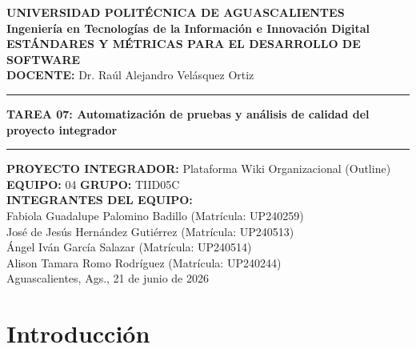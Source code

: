 \documentclass[12pt,oneside]{report}
\begin{document}
\begin{titlepage}
    \centering
    \textbf{UNIVERSIDAD POLITÉCNICA DE AGUASCALIENTES} \\[0.4cm]
    \textbf{Ingeniería en Tecnologías de la Información e Innovación Digital} \\[1.5cm]
    
    {\large \textbf{ESTÁNDARES Y MÉTRICAS PARA EL DESARROLLO DE SOFTWARE}} \\[0.5cm]
    {\large \textbf{DOCENTE:} Dr. Raúl Alejandro Velásquez Ortiz} \\[1.5cm]
    
    \hrule
    \vspace{0.4cm}
    {\Large \textbf{TAREA 07: Automatización de pruebas y análisis de calidad del proyecto integrador}} \\[0.4cm]
    \hrule
    \vspace{1.5cm}
    
    {\large \textbf{PROYECTO INTEGRADOR:} Plataforma Wiki Organizacional (Outline)} \\[0.5cm]
    {\large \textbf{EQUIPO:} 04 \quad \textbf{GRUPO:} TIID05C} \\[1cm]
    
    {\large \textbf{INTEGRANTES DEL EQUIPO:}} \\
    {\large Fabiola Guadalupe Palomino Badillo \quad (Matrícula: UP240259)} \\
    {\large José de Jesús Hernández Gutiérrez \quad (Matrícula: UP240513)} \\
    {\large Ángel Iván García Salazar \quad (Matrícula: UP240514)} \\
    {\large Alison Tamara Romo Rodríguez \quad (Matrícula: UP240244)} \\[1.5cm]
    
    \vfill
    {\large Aguascalientes, Ags., 21 de junio de 2026}
\end{titlepage}

\tableofcontents
\listoffigures
\listoftables
\clearpage

\setcounter{page}{1}

\chapter*{Introducción}
\end{document}
